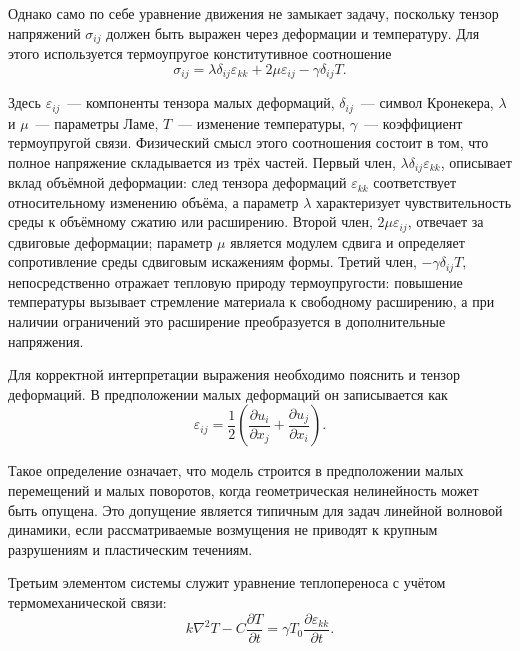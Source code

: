 Однако само по себе уравнение движения не замыкает задачу, поскольку тензор напряжений $\sigma_{ij}$ должен быть выражен через деформации и температуру. Для этого используется термоупругое конститутивное соотношение
\begin{equation}
\sigma_{ij}=\lambda \delta_{ij}\varepsilon_{kk}+2\mu \varepsilon_{ij}-\gamma \delta_{ij}T.
\end{equation}

Здесь $\varepsilon_{ij}$~--- компоненты тензора малых деформаций, $\delta_{ij}$~--- символ Кронекера, $\lambda$ и $\mu$~--- параметры Ламе, $T$~--- изменение температуры, $\gamma$~--- коэффициент термоупругой связи. Физический смысл этого соотношения состоит в том, что полное напряжение складывается из трёх частей. Первый член, $\lambda \delta_{ij}\varepsilon_{kk}$, описывает вклад объёмной деформации: след тензора деформаций $\varepsilon_{kk}$ соответствует относительному изменению объёма, а параметр $\lambda$ характеризует чувствительность среды к объёмному сжатию или расширению. Второй член, $2\mu\varepsilon_{ij}$, отвечает за сдвиговые деформации; параметр $\mu$ является модулем сдвига и определяет сопротивление среды сдвиговым искажениям формы. Третий член, $-\gamma \delta_{ij}T$, непосредственно отражает тепловую природу термоупругости: повышение температуры вызывает стремление материала к свободному расширению, а при наличии ограничений это расширение преобразуется в дополнительные напряжения.

Для корректной интерпретации выражения необходимо пояснить и тензор деформаций. В предположении малых деформаций он записывается как
\begin{equation}
\varepsilon_{ij}=\frac{1}{2}\left(\frac{\partial u_i}{\partial x_j}+\frac{\partial u_j}{\partial x_i}\right).
\end{equation}

Такое определение означает, что модель строится в предположении малых перемещений и малых поворотов, когда геометрическая нелинейность может быть опущена. Это допущение является типичным для задач линейной волновой динамики, если рассматриваемые возмущения не приводят к крупным разрушениям и пластическим течениям.

Третьим элементом системы служит уравнение теплопереноса с учётом термомеханической связи:
\begin{equation}
k\nabla^2T-C\frac{\partial T}{\partial t}=\gamma T_0\frac{\partial \varepsilon_{kk}}{\partial t}.
\end{equation}

